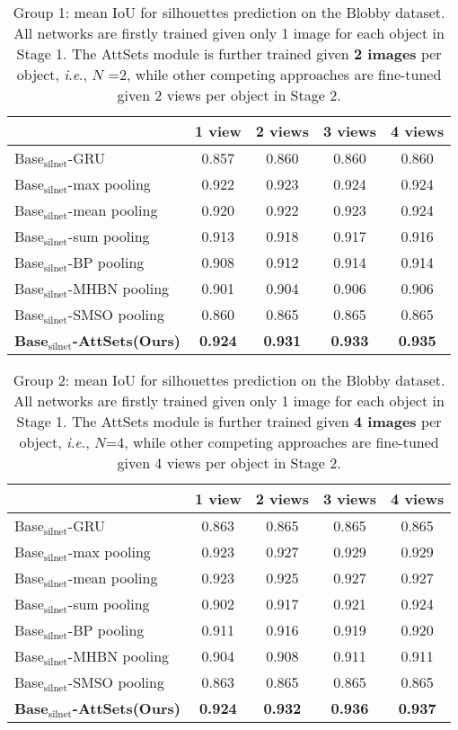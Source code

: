 \documentclass[twocolumn]{svjour3}    \pdfoutput=1
\newcommand{\nickname}{AttSets}
\newcommand{\ie}{\textit{i}.\textit{e}., }
\begin{document}
\begin{table}[ht]
\caption{Group 1: mean IoU for silhouettes prediction on the Blobby dataset. All networks are firstly trained given only 1 image for each object in Stage 1. The \nickname{} module is further trained given \textbf{2 images} per object, \ie $N$ =2, while other competing approaches are fine-tuned given 2 views per object in Stage 2.}
\centering
\label{tab:iou_blobby_02v}
\tabcolsep=0.05cm
\begin{tabular}{ l|cccc}
\hline
&1 view&2 views&3 views& 4 views \\
\hline
Base$_{\textrm{silnet}}$-GRU &0.857&0.860&0.860&0.860\\
Base$_{\textrm{silnet}}$-max pooling &0.922&0.923&0.924&0.924\\
Base$_{\textrm{silnet}}$-mean pooling &0.920&0.922&0.923&0.924\\
Base$_{\textrm{silnet}}$-sum pooling &0.913&0.918&0.917&0.916\\
Base$_{\textrm{silnet}}$-BP pooling &0.908&0.912&0.914&0.914\\
Base$_{\textrm{silnet}}$-MHBN pooling &0.901&0.904&0.906&0.906\\
Base$_{\textrm{silnet}}$-SMSO pooling &0.860&0.865&0.865&0.865\\
\textbf{Base$_{\textrm{silnet}}$-\nickname{}(Ours)} &\textbf{0.924}&\textbf{0.931}&\textbf{0.933}&\textbf{0.935} \\
\hline
\end{tabular}
\vspace{-0.35 cm}
\end{table}
\begin{table}[h]
\caption{Group 2: mean IoU for silhouettes prediction on the Blobby dataset. All networks are firstly trained given only 1 image for each object in Stage 1. The \nickname{} module is further trained given \textbf{4 images} per object, \ie $N$=4, while other competing approaches are fine-tuned given 4 views per object in Stage 2.}
\centering
\label{tab:iou_blobby_04v}
\tabcolsep=0.05cm
\begin{tabular}{ l|cccc}
\hline
&1 view&2 views&3 views& 4 views \\
\hline
Base$_{\textrm{silnet}}$-GRU &0.863&0.865&0.865&0.865\\
Base$_{\textrm{silnet}}$-max pooling &0.923&0.927&0.929&0.929\\
Base$_{\textrm{silnet}}$-mean pooling &0.923&0.925&0.927&0.927\\
Base$_{\textrm{silnet}}$-sum pooling &0.902&0.917&0.921&0.924\\
Base$_{\textrm{silnet}}$-BP pooling &0.911&0.916&0.919&0.920\\
Base$_{\textrm{silnet}}$-MHBN pooling &0.904&0.908&0.911&0.911\\
Base$_{\textrm{silnet}}$-SMSO pooling &0.863&0.865&0.865&0.865\\
\textbf{Base$_{\textrm{silnet}}$-\nickname{}(Ours)} &\textbf{0.924}&\textbf{0.932}&\textbf{0.936}&\textbf{0.937} \\
\hline
\end{tabular}
\vspace{-0.35 cm}
\end{table}
\end{document}
